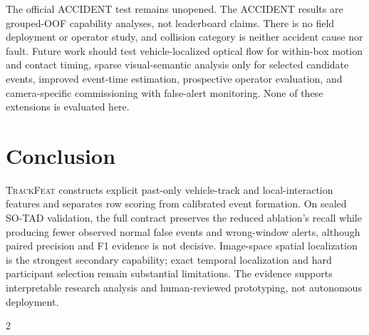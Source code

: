 \documentclass[letterpaper]{article}
\newcommand{\method}{\textsc{TrackFeat}}
\begin{document}
The official ACCIDENT test remains unopened. The ACCIDENT results are grouped-OOF capability analyses, not leaderboard claims. There is no field deployment or operator study, and collision category is neither accident cause nor fault. Future work should test vehicle-localized optical flow for within-box motion and contact timing, sparse visual-semantic analysis only for selected candidate events, improved event-time estimation, prospective operator evaluation, and camera-specific commissioning with false-alert monitoring. None of these extensions is evaluated here.

\section{Conclusion}
\method{} constructs explicit past-only vehicle-track and local-interaction features and separates row scoring from calibrated event formation. On sealed SO-TAD validation, the full contract preserves the reduced ablation's recall while producing fewer observed normal false events and wrong-window alerts, although paired precision and F1 evidence is not decisive. Image-space spatial localization is the strongest secondary capability; exact temporal localization and hard participant selection remain substantial limitations. The evidence supports interpretable research analysis and human-reviewed prototyping, not autonomous deployment.

\clearpage
\onecolumn
\begin{multicols}{2}

\end{multicols}
\end{document}
